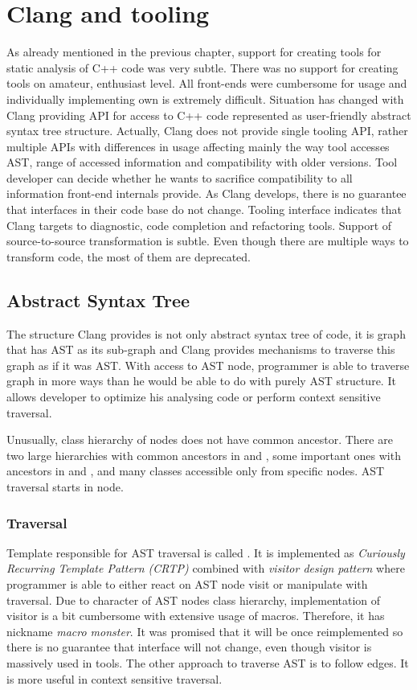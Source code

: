 \chapter{Clang and tooling}
As already mentioned in the previous chapter, support for creating tools for static analysis of C++ code was very subtle. There was no support for creating tools on amateur, enthusiast level. All front-ends were cumbersome for usage and individually implementing own is extremely difficult. Situation has changed with Clang providing API for access to C++ code represented as user-friendly abstract syntax tree structure. Actually, Clang does not provide single tooling API, rather multiple APIs with differences in usage affecting mainly the way tool accesses AST, range of accessed information and compatibility with older versions. Tool developer can decide whether he wants to sacrifice compatibility to all information front-end internals provide. As Clang develops, there is no guarantee that interfaces in their code base do not change. Tooling interface indicates that Clang targets to diagnostic, code completion and refactoring tools. Support of source-to-source transformation is subtle. Even though there are multiple ways to transform code, the most of them are deprecated.

\section{Abstract Syntax Tree}
The structure Clang provides is not only abstract syntax tree of code, it is graph that has AST as its sub-graph and Clang provides mechanisms to traverse this graph as if it was AST. With access to AST node, programmer is able to traverse graph in more ways than he would be able to do with purely AST structure. It allows developer to optimize his analysing code or perform context sensitive traversal.

Unusually, class hierarchy of nodes does not have common ancestor. There are two large hierarchies with common ancestors in  and , some important ones with ancestors in  and , and many classes accessible only from specific nodes. AST traversal starts in  node. 

\subsection{Traversal}
\label{clang-ast-traversal}
Template responsible for AST traversal is called . It is implemented as \emph{Curiously Recurring Template Pattern (CRTP)} combined with \emph{visitor design pattern} where programmer is able to either react on AST node visit or manipulate with traversal. Due to character of AST nodes class hierarchy, implementation of visitor is a bit cumbersome with extensive usage of macros. Therefore, it has nickname \textit{macro monster}. It was promised that it will be once reimplemented so there is no guarantee that interface will not change, even though visitor is massively used in tools. The other approach to traverse AST is to follow edges. It is more useful in context sensitive traversal.

